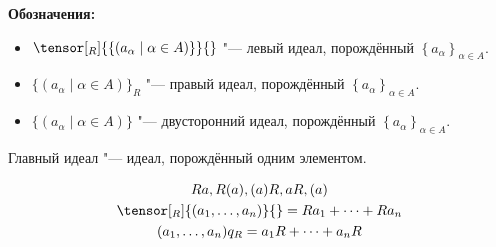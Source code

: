\textbf{Обозначения:}
\begin{itemize}
\item
	$\tensor[_R]{\{(a_\alpha \mid \alpha \in A)\}}{}$ "--- левый идеал, порождённый $\left\{ a_\alpha \right\}_{\alpha \in A}$.

\item
	$\{(a_\alpha \mid \alpha \in A)\}_R$ "--- правый идеал, порождённый $\left\{ a_\alpha \right\}_{\alpha \in A}$.

\item
	$\{(a_\alpha \mid \alpha \in A)\}$ "--- двусторонний идеал, порождённый $\left\{ a_\alpha \right\}_{\alpha \in A}$.
\end{itemize}

\begin{Def}
	Главный идеал "--- идеал, порождённый одним элементом.

	\begin{gather*}
		Ra, R(a), (a)R, aR, (a) \\
		\tensor[_R]{(a_1, \dots, a_n)}{} = Ra_1 + \dots + Ra_n \\
		(a_1, \dots, a_n)q_R = a_1R + \dots + a_nR
	\end{gather*}
\end{Def}

